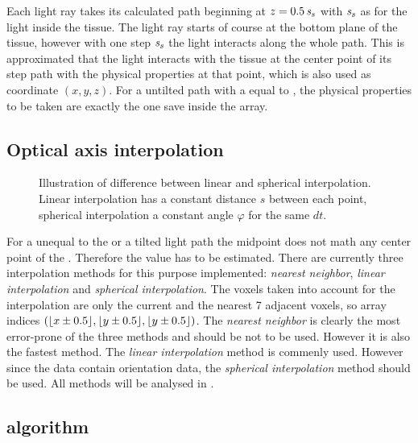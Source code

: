 % 
% 
Each light ray takes its calculated path beginning at $z=\SI{0.5}{\textnormal{$\mathit{s_{s}}$}}$ with $\textnormal{$\mathit{s_{s}}$}$ as \stepsize{} for the light inside the tissue.
The light ray starts of course at the bottom plane of the tissue, however with one step $\textnormal{$\mathit{s_{s}}$}$ the light interacts along the whole path.
This is approximated that the light interacts with the tissue at the center point of its step path with the physical properties at that point, which is also used as coordinate $(x,y,z)$.
For a untilted path with a \stepsize{} equal to \voxelsize{}, the physical properties to be taken are exactly the one save inside the \opticalaxis{} array.
% 
\subsection{Optical axis interpolation}
% 
\begin{figure}[!t]
\centering
\def\tikzwidth{0.75*\textwidth}
\tikzset{external/export=false}
\caption[Illustration linear and spherical interpolation.]{Illustration of difference between linear and spherical interpolation. Linear interpolation has a constant distance $s$ between each point, spherical interpolation a constant angle $\varphi$ for the same $dt$.}
\label{fig:vectorfield_disc}
\end{figure}
% 
For a \stepsize{} unequal to the \voxelsize{} or a tilted light path the midpoint does not math any center point of the \opticalaxis{}.
Therefore the value has to be estimated.
There are currently three interpolation methods for this purpose implemented: \textit{nearest neighbor}, \textit{linear interpolation} and \textit{spherical interpolation}. 
The voxels taken into account for the interpolation are only the current and the nearest 7 adjacent voxels, so array indices $(\lfloor x\pm0.5\rfloor,\lfloor y\pm0.5\rfloor,\lfloor y\pm0.5\rfloor)$.
% 
The \textit{nearest neighbor} is clearly the most error-prone of the three methods and should be not to be used. 
However it is also the fastest method.
The \textit{linear interpolation} method is commenly used.
However since the data contain orientation data, the \textit{spherical interpolation} method should be used.
All methods will be analysed in \dummy{}.
% 
% 
\subsection{algorithm}
% 
